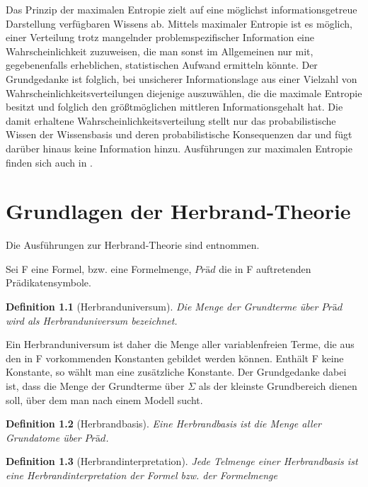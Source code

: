 \documentclass[a4paper, 11pt]{book}
\newtheorem{Def}{Definition }[section]
\begin{document}
Das Prinzip der maximalen Entropie zielt auf eine möglichst informationsgetreue Darstellung verfügbaren Wissens ab. Mittels maximaler Entropie ist es möglich, einer Verteilung trotz mangelnder problemspezifischer Information eine Wahrscheinlichkeit zuzuweisen, die man sonst im Allgemeinen nur mit, gegebenenfalls erheblichen, statistischen Aufwand ermitteln könnte. Der Grundgedanke ist folglich, bei unsicherer Informationslage aus einer Vielzahl von Wahrscheinlichkeitsverteilungen diejenige auszuwählen, die die maximale Entropie besitzt und folglich den größtmöglichen mittleren Informationsgehalt hat. Die damit erhaltene Wahrscheinlichkeitsverteilung stellt nur das probabilistische Wissen der Wissensbasis und deren probabilistische Konsequenzen dar und fügt darüber hinaus keine Information hinzu.
Ausführungen zur maximalen Entropie finden sich auch in \cite{TFLKIB10}.

\chapter{Grundlagen der Herbrand-Theorie}
\label{Herb}
Die Ausführungen zur Herbrand-Theorie sind \cite{BKI08} entnommen.

Sei F eine Formel, bzw. eine Formelmenge, $ Präd $ die in F auftretenden Prädikatensymbole.
\begin{Def}[Herbranduniversum]
Die Menge der Grundterme über $ Präd $ wird als Herbranduniversum bezeichnet.
\end{Def} 
 Ein Herbranduniversum ist daher die Menge aller variablenfreien Terme, die aus den in F vorkommenden Konstanten gebildet werden können. Enthält F keine Konstante, so wählt man eine zusätzliche Konstante. Der Grundgedanke dabei ist, dass die Menge der Grundterme über $ \Sigma $ als der kleinste Grundbereich dienen soll, über dem man nach einem Modell sucht. 


\begin{Def}[Herbrandbasis] 
Eine Herbrandbasis ist die Menge aller Grundatome über $ Präd $.
\end{Def}


\begin{Def}[Herbrandinterpretation] 
Jede Telmenge einer Herbrandbasis ist eine Herbrandinterpretation der Formel bzw. der Formelmenge
\end{Def}
\end{document}
